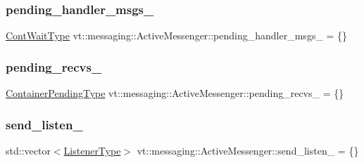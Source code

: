 \subsubsection{\texorpdfstring{pending\+\_\+handler\+\_\+msgs\+\_\+}{pending\_handler\_msgs\_}}
{\footnotesize\ttfamily \hyperlink{structvt_1_1messaging_1_1_active_messenger_a1c52f4ec0c93821191cb3e69dc7c8604}{Cont\+Wait\+Type} vt\+::messaging\+::\+Active\+Messenger\+::pending\+\_\+handler\+\_\+msgs\+\_\+ = \{\}\hspace{0.3cm}{\ttfamily [private]}}

\mbox{\label{structvt_1_1messaging_1_1_active_messenger_a77b9f9e025e09d85ba39262e523599b8}} 
\subsubsection{\texorpdfstring{pending\+\_\+recvs\+\_\+}{pending\_recvs\_}}
{\footnotesize\ttfamily \hyperlink{structvt_1_1messaging_1_1_active_messenger_a388e97eeb72592e57551e045b43bcfde}{Container\+Pending\+Type} vt\+::messaging\+::\+Active\+Messenger\+::pending\+\_\+recvs\+\_\+ = \{\}\hspace{0.3cm}{\ttfamily [private]}}

\mbox{\label{structvt_1_1messaging_1_1_active_messenger_a52779f8ed30e23442a802e42c3462a0b}} 
\subsubsection{\texorpdfstring{send\+\_\+listen\+\_\+}{send\_listen\_}}
{\footnotesize\ttfamily std\+::vector$<$\hyperlink{structvt_1_1messaging_1_1_active_messenger_a63878fd4ef1fbc505bd1313d32049ca9}{Listener\+Type}$>$ vt\+::messaging\+::\+Active\+Messenger\+::send\+\_\+listen\+\_\+ = \{\}\hspace{0.3cm}{\ttfamily [private]}}

